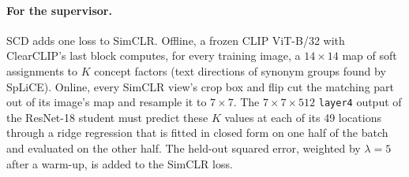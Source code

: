\documentclass[11pt]{article}
\begin{document}
\paragraph{For the supervisor.} SCD adds one loss to SimCLR. Offline, a frozen CLIP ViT-B/32 with ClearCLIP's
last block computes, for every training image, a $14\times14$ map of soft assignments to $K$ concept factors
(text directions of synonym groups found by SpLiCE). Online, every SimCLR view's crop box and flip cut the
matching part out of its image's map and resample it to $7\times7$. The $7\times7\times512$ \texttt{layer4}
output of the ResNet-18 student must predict these $K$ values at each of its 49 locations through a ridge
regression that is fitted in closed form on one half of the batch and evaluated on the other half. The
held-out squared error, weighted by $\lambda=5$ after a warm-up, is added to the SimCLR loss.
\end{document}

